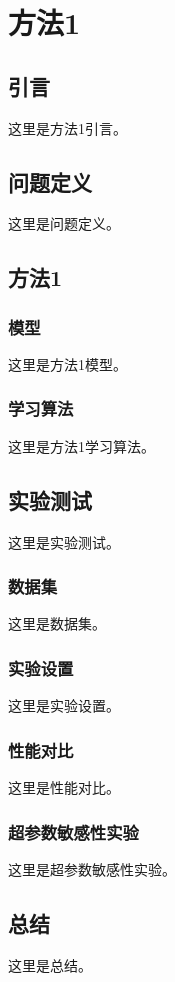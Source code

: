 \chapter{方法1}\label{chp:method1}
\section{引言}
这里是方法1引言。
\section{问题定义}
这里是问题定义。
\section{方法1}
\subsection{模型}
这里是方法1模型。
\subsection{学习算法}
这里是方法1学习算法。
\section{实验测试}
这里是实验测试。
\subsection{数据集}
这里是数据集。
\subsection{实验设置}
这里是实验设置。
\subsection{性能对比}
这里是性能对比。
\subsection{超参数敏感性实验}
这里是超参数敏感性实验。
\section{总结}
这里是总结。
